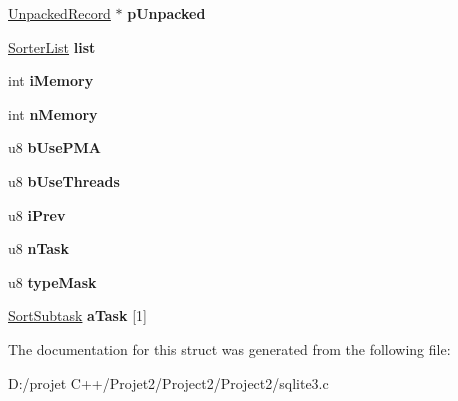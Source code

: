 \begin{DoxyCompactItemize}
\mbox{\hyperlink{struct_unpacked_record}{Unpacked\+Record}} $\ast$ {\bfseries p\+Unpacked}
\item 
\mbox{\label{struct_vdbe_sorter_a5e4a486d8aba4b45e3b7000d0a3b2b5b}} 
\mbox{\hyperlink{struct_sorter_list}{Sorter\+List}} {\bfseries list}
\item 
\mbox{\label{struct_vdbe_sorter_a32ec545e32e7b79fe8f72e15f4656786}} 
int {\bfseries i\+Memory}
\item 
\mbox{\label{struct_vdbe_sorter_a53740d50989018beadaff7fe814407f5}} 
int {\bfseries n\+Memory}
\item 
\mbox{\label{struct_vdbe_sorter_ae373cf1d1f102b34e005f0326f690bd7}} 
u8 {\bfseries b\+Use\+P\+MA}
\item 
\mbox{\label{struct_vdbe_sorter_aaf62cb4ac61aa2bcbf4ee00a2e12fe90}} 
u8 {\bfseries b\+Use\+Threads}
\item 
\mbox{\label{struct_vdbe_sorter_aa7cc8519f1b6d621de13fc383fb5478a}} 
u8 {\bfseries i\+Prev}
\item 
\mbox{\label{struct_vdbe_sorter_a5a6475ca0a9de4321653a4afb4fcbef0}} 
u8 {\bfseries n\+Task}
\item 
\mbox{\label{struct_vdbe_sorter_a75a7b43b4fe86ee6348dd576b4fb1c1f}} 
u8 {\bfseries type\+Mask}
\item 
\mbox{\label{struct_vdbe_sorter_abf5c3d717a20bf0ce713862f0c7b2653}} 
\mbox{\hyperlink{struct_sort_subtask}{Sort\+Subtask}} {\bfseries a\+Task} \mbox{[}1\mbox{]}
\end{DoxyCompactItemize}


The documentation for this struct was generated from the following file\+:\begin{DoxyCompactItemize}
\item 
D\+:/projet C++/\+Projet2/\+Project2/\+Project2/sqlite3.\+c\end{DoxyCompactItemize}
